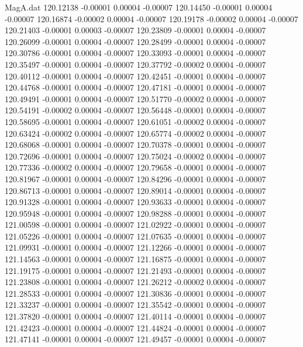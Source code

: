\begin{filecontents}{MagA.dat}
 120.12138   -0.00001    0.00004   -0.00007
 120.14450   -0.00001    0.00004   -0.00007
 120.16874   -0.00002    0.00004   -0.00007
 120.19178   -0.00002    0.00004   -0.00007
 120.21403   -0.00001    0.00003   -0.00007
 120.23809   -0.00001    0.00004   -0.00007
 120.26099   -0.00001    0.00004   -0.00007
 120.28499   -0.00001    0.00004   -0.00007
 120.30786   -0.00001    0.00004   -0.00007
 120.33093   -0.00001    0.00004   -0.00007
 120.35497   -0.00001    0.00004   -0.00007
 120.37792   -0.00002    0.00004   -0.00007
 120.40112   -0.00001    0.00004   -0.00007
 120.42451   -0.00001    0.00004   -0.00007
 120.44768   -0.00001    0.00004   -0.00007
 120.47181   -0.00001    0.00004   -0.00007
 120.49491   -0.00001    0.00004   -0.00007
 120.51770   -0.00002    0.00004   -0.00007
 120.54191   -0.00002    0.00004   -0.00007
 120.56448   -0.00001    0.00004   -0.00007
 120.58695   -0.00001    0.00004   -0.00007
 120.61051   -0.00002    0.00004   -0.00007
 120.63424   -0.00002    0.00004   -0.00007
 120.65774   -0.00002    0.00004   -0.00007
 120.68068   -0.00001    0.00004   -0.00007
 120.70378   -0.00001    0.00004   -0.00007
 120.72696   -0.00001    0.00004   -0.00007
 120.75024   -0.00002    0.00004   -0.00007
 120.77336   -0.00002    0.00004   -0.00007
 120.79658   -0.00001    0.00004   -0.00007
 120.81967   -0.00001    0.00004   -0.00007
 120.84296   -0.00001    0.00004   -0.00007
 120.86713   -0.00001    0.00004   -0.00007
 120.89014   -0.00001    0.00004   -0.00007
 120.91328   -0.00001    0.00004   -0.00007
 120.93633   -0.00001    0.00004   -0.00007
 120.95948   -0.00001    0.00004   -0.00007
 120.98288   -0.00001    0.00004   -0.00007
 121.00598   -0.00001    0.00004   -0.00007
 121.02922   -0.00001    0.00004   -0.00007
 121.05226   -0.00001    0.00004   -0.00007
 121.07635   -0.00001    0.00004   -0.00007
 121.09931   -0.00001    0.00004   -0.00007
 121.12266   -0.00001    0.00004   -0.00007
 121.14563   -0.00001    0.00004   -0.00007
 121.16875   -0.00001    0.00004   -0.00007
 121.19175   -0.00001    0.00004   -0.00007
 121.21493   -0.00001    0.00004   -0.00007
 121.23808   -0.00001    0.00004   -0.00007
 121.26212   -0.00002    0.00004   -0.00007
 121.28533   -0.00001    0.00004   -0.00007
 121.30836   -0.00001    0.00004   -0.00007
 121.33237   -0.00001    0.00004   -0.00007
 121.35542   -0.00001    0.00004   -0.00007
 121.37820   -0.00001    0.00004   -0.00007
 121.40114   -0.00001    0.00004   -0.00007
 121.42423   -0.00001    0.00004   -0.00007
 121.44824   -0.00001    0.00004   -0.00007
 121.47141   -0.00001    0.00004   -0.00007
 121.49457   -0.00001    0.00004   -0.00007

\end{filecontents}
